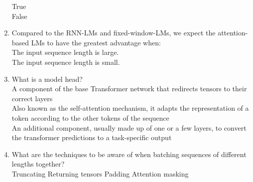 \begin{enumerate}
        \hspace{1cm}
        \choice{} True \hspace{1cm} \\
        \checkmark False \\
        \solution{}
    \item Compared to the RNN-LMs and fixed-window-LMs, we expect the attention-based LMs to have the greatest advantage when: \\ 
        \hspace{1cm}\checkmark The input sequence length is large. \\ 
        \hspace{1cm}\choice{} The input sequence length is small. \\
        \solution{}
    \item What is a model head? \\ 
        \hspace{1cm}\choice{} A component of the base Transformer network that redirects tensors to their correct layers \\ 
        \hspace{1cm}\choice{} Also known as the self-attention mechanism, it adapts the representation of a token according to the other tokens of the sequence \\ 
        \hspace{1cm}\checkmark An additional component, usually made up of one or a few layers, to convert the transformer predictions to a task-specific output  \\ 
        \solution{}
    \item  What are the techniques to be aware of when batching sequences of different lengths together? \\ 
        \hspace{1cm}\checkmark Truncating 
        \hspace{1cm}\choice{} Returning tensors
        \hspace{1cm}\checkmark Padding
        \hspace{1cm}\checkmark Attention masking \\ 
        \solution{}


\end{enumerate}

\newpage


\newcommand{\xv}{\mathbf{x}}
\newcommand{\yv}{\mathbf{y}}
\newcommand{\Wv}{\mathbf{W}}
\newcommand{\Xv}{\mathbf{X}}
\newcommand{\Yv}{\mathbf{Y}}
\newcommand{\hv}{\mathbf{h}}
\newcommand{\ov}{\mathbf{o}}
\newcommand{\zv}{\mathbf{z}}
\newcommand{\gv}{\mathbf{g}}



